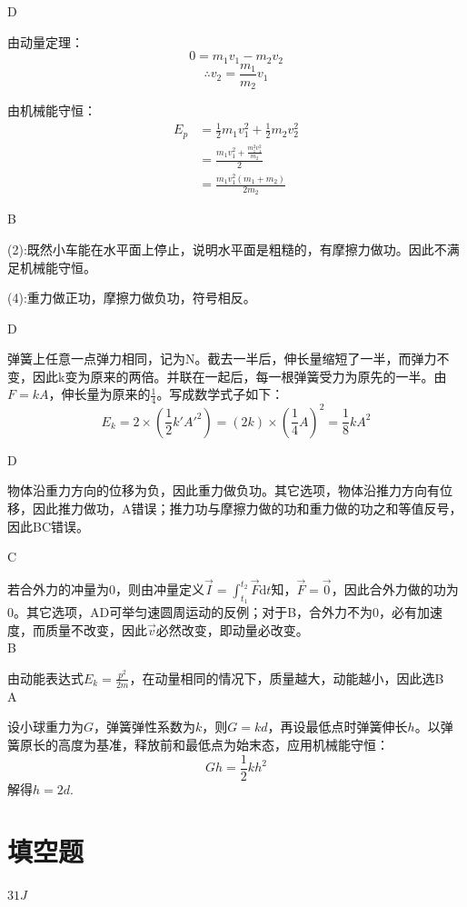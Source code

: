\documentclass[b5paper,opensource,sourcefont,parskip]{qyxf-book}
\newcommand{\di}[1]{\mathrm{d}#1}
\begin{document}
D

\solve 由动量定理：
\[0=m_1v_1-m_2v_2\]
\[\therefore{}v_2=\frac{m_1}{m_2}v_1\]

由机械能守恒：
\begin{align*}
E_p &=\frac{1}{2}m_1v_1^2+\frac{1}{2}m_2v_2^2\\
&=\frac{m_1v_1^2+\frac{m_1^2v_1^2}{m_2}}{2}\\
&=\frac{m_1v_1^2\left(m_1+m_2\right)}{2m_2}
\end{align*}

B

\solve (2):既然小车能在水平面上停止，说明水平面是粗糙的，有摩擦力做功。因此不满足机械能守恒。

(4):重力做正功，摩擦力做负功，符号相反。

D

\solve 弹簧上任意一点弹力相同，记为N。截去一半后，伸长量缩短了一半，而弹力不变，因此k变为原来的两倍。并联在一起后，每一根弹簧受力为原先的一半。由$F=kA$，伸长量为原来的$\frac{1}{4}$。写成数学式子如下：
\[
E_k=2\times\left(\frac{1}{2}k'A'^2\right)=\left(2k\right)\times\left(\frac{1}{4}A\right)^2=\frac{1}{8}kA^2
\]

D

\solve 物体沿重力方向的位移为负，因此重力做负功。其它选项，物体沿推力方向有位移，因此推力做功，A错误；推力功与摩擦力做的功和重力做的功之和等值反号，因此BC错误。

C

\solve 若合外力的冲量为0，则由冲量定义$\vec{I}=\int_{t_1}^{t_2}\vec{F}\di{t}$知，$\vec{F}=\vec{0}$，因此合外力做的功为0。其它选项，AD可举匀速圆周运动的反例；对于B，合外力不为0，必有加速度，而质量不改变，因此$\vec{v}$必然改变，即动量必改变。\\

B

\solve 由动能表达式$E_k=\frac{p^2}{2m}$，在动量相同的情况下，质量越大，动能越小，因此选B\\

A

\solve 设小球重力为$G$，弹簧弹性系数为$k$，则$G=kd$，再设最低点时弹簧伸长$h$。以弹簧原长的高度为基准，释放前和最低点为始末态，应用机械能守恒：
\[Gh=\frac{1}{2}kh^2\]
解得$h=2d.$

\section{填空题}

$31J$
\end{document}
